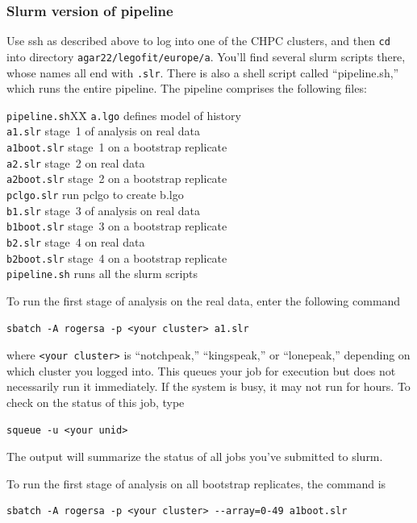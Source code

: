 \documentclass[11pt]{article}
\newenvironment{leftindent}%
{\begin{list}{}%
         {\setlength{\leftmargin}{2em}}%
         \item[]%
}{\end{list}}
\begin{document}
\subsubsection{Slurm version of pipeline}
\label{sec.slurmpipe}
Use ssh as described above to log into one of the CHPC clusters, and
then \texttt{cd} into directory
\texttt{agar22/legofit/europe/a}. You'll find several slurm scripts
there, whose names all end with \texttt{.slr}. There is also a shell
script called ``pipeline.sh,'' which runs the entire pipeline. The
pipeline comprises the following files:
\begin{leftindent}
  \begin{tabbing}
\verb|pipeline.sh|XX\=\kill
\texttt{a.lgo} \> defines model of history\\    
\texttt{a1.slr} \> stage~1 of analysis on real data\\
\texttt{a1boot.slr} \> stage~1 on a bootstrap replicate\\
\texttt{a2.slr} \> stage~2 on real data\\
\texttt{a2boot.slr} \> stage~2 on a bootstrap replicate\\
\texttt{pclgo.slr} \> run pclgo to create b.lgo  \\
\texttt{b1.slr} \> stage~3 of analysis on real data\\
\texttt{b1boot.slr} \> stage~3 on a bootstrap replicate\\
\texttt{b2.slr} \> stage~4 on real data\\
\texttt{b2boot.slr} \> stage~4 on a bootstrap replicate\\
\verb|pipeline.sh| \> runs all the slurm scripts
\end{tabbing}
\end{leftindent}
To run the first stage of analysis on the real data, enter the
following command
\begin{verbatim}
sbatch -A rogersa -p <your cluster> a1.slr
\end{verbatim}
where \verb|<your cluster>| is ``notchpeak,'' ``kingspeak,'' or
``lonepeak,'' depending on which cluster you logged into.
This queues your job for execution but does not necessarily run it
immediately. If the system is busy, it may not run for hours. To check
on the status of this job, type
\begin{verbatim}
squeue -u <your unid>
\end{verbatim}
The output will summarize the status of all jobs you've submitted to
slurm.

To run the first stage of analysis on all bootstrap replicates, the
command is
\begin{verbatim}
sbatch -A rogersa -p <your cluster> --array=0-49 a1boot.slr
\end{verbatim}
\end{document}
